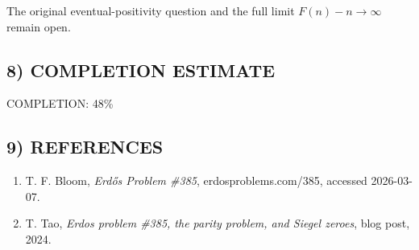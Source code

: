 The original eventual-positivity question and the full limit $F(n)-n\to\infty$ remain open.

\subsection*{8) COMPLETION ESTIMATE}
COMPLETION: 48\%

\subsection*{9) REFERENCES}
\begin{enumerate}
\item T. F. Bloom, \emph{Erd\H{o}s Problem \#385}, erdosproblems.com/385, accessed 2026-03-07.
\item T. Tao, \emph{Erdos problem \#385, the parity problem, and Siegel zeroes}, blog post, 2024.
\end{enumerate}


